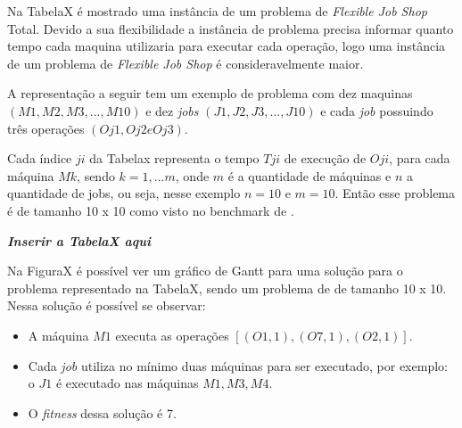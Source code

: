             Na TabelaX é mostrado uma instância de um problema de \textit{Flexible Job Shop} Total. Devido a sua flexibilidade a instância de problema precisa informar quanto tempo cada maquina utilizaria para executar cada operação, logo uma instância de um problema de \textit{Flexible Job Shop} é consideravelmente maior.\newline

            A representação a seguir tem um exemplo de problema com dez maquinas $(M1, M2, M3, ..., M10)$ e dez \textit{jobs} $(J1, J2, J3, ..., J10)$ e cada \textit{job} possuindo três operações $(Oj1, Oj2 e Oj3)$.\newline

            Cada índice $ji$ da Tabelax representa o tempo $Tji$ de execução de $Oji$, para cada máquina $Mk$, sendo $k = 1,... m$, onde $m$ é a quantidade de máquinas e $n$ a quantidade de jobs, ou seja, nesse exemplo $n = 10$ e $m = 10$.\newline
            Então esse problema é de tamanho 10 x 10 como visto no benchmark de \cite{Kacem2002}.\newline

            \textit{\textbf{Inserir a TabelaX aqui}}\newline



            Na FiguraX é possível ver um gráfico de Gantt para uma solução para o problema representado na TabelaX, sendo um problema de \cite{Kacem2002} de tamanho 10 x 10. Nessa solução é possível se observar:
            \begin{itemize}
                \item A máquina $M1$ executa as operações $[(O1,1), (O7,1), (O2,1)]$.
                \item Cada \textit{job} utiliza no mínimo duas máquinas para ser executado, por exemplo: o $J1$ é executado nas máquinas $M1 , M3, M4$.
                \item O \textit{fitness} dessa solução é 7.
            \end{itemize}

